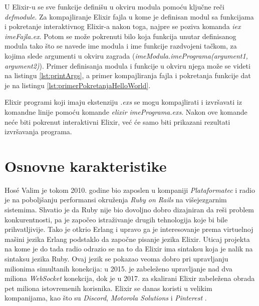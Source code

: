 \documentclass[12pt,oneside]{memoir}
\begin{document}


\noindent U Elixir-u se sve funkcije definišu u okviru modula pomoću ključne reči \textit{defmodule}. Za kompajliranje Elixir fajla u kome je definisan modul sa funkcijama i pokretanje interaktivnog Elixir-a nakon toga, najpre se poziva komanda \textit{iex imeFajla.ex}. Potom se može pokrenuti bilo koja funkcija unutar definisanog modula tako što se navede ime modula i ime funkcije razdvojeni tačkom, za kojima slede argumenti u okviru zagrada (\textit{imeModula.imePrograma(argument1, argument2)}). Primer definisanja modula i funkcije u okviru njega može se videti na listingu \ref{lst:printArgs}, a primer kompajliranja fajla i pokretanja funkcije dat je na listingu \ref{lst:primerPokretanjaHelloWorld}.





Elixir programi koji imaju ekstenziju \textit{.exs} se mogu kompajlirati i izvršavati iz komandne linije pomoću komande \textit{elixir imePrograma.exs}. Nakon ove komande neće biti pokrenut interaktivni Elixir, već će samo biti prikazani rezultati izvršavanja programa.

\section{Osnovne karakteristike}

Hosé Valim je tokom 2010. godine bio zaposlen u kompaniji \textit{Plataformatec} \cite{Platformatec} i radio je na poboljšanju performansi okruženja
\textit{Ruby on Rails} na višejezgarnim sistemima. Shvatio je da Ruby nije bio dovoljno dobro dizajniran da reši problem konkurentnosti, pa je započeo istraživanje drugih tehnologija koje bi bile prihvatljivije. Tako je otkrio Erlang i upravo ga je interesovanje prema virtuelnoj mašini jezika Erlang podstaklo da započne pisanje jezika Elixir. Uticaj projekta na kome je do tada radio odrazio se na to da Elixir ima sintaksu koja je nalik na sintaksu jezika Ruby. Ovaj jezik se pokazao veoma dobro pri upravljanju
milionima simultanih konekcija: u 2015. je zabeleženo upravljanje nad dva miliona \textit{WebSocket} konekcija, dok je u 2017. za skalirani Elixir zabeležena obrada pet miliona istovremenih korisnika. Elixir se danas koristi u velikim kompanijama, kao što su \textit{Discord}, \textit{Motorola Solutions} i \textit{Pinterest} \cite{HistoryOfElixir}.
\end{document}
